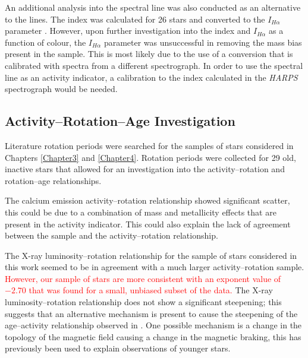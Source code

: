 An additional analysis into the \Halpha spectral line was also conducted as an alternative to the \caII lines. The \Halpha index was calculated for 26 stars and converted to the $I_{H\alpha}$ parameter \citep{Gomes_da_Silva_etal_2014}. However, upon further investigation into the \Halpha index and $I_{H\alpha}$ as a function of colour, the $I_{H\alpha}$ parameter was unsuccessful in removing the mass bias present in the sample. This is most likely due to the use of a conversion that is calibrated with spectra from a different spectrograph. In order to use the \Halpha spectral line as an activity indicator, a calibration to the \Halpha index calculated in the \textit{HARPS} spectrograph would be needed.

\subsection{Activity--Rotation--Age Investigation}

Literature rotation periods were searched for the samples of stars considered in Chapters \ref{Chapter3} and \ref{Chapter4}. Rotation periods were collected for 29 old, inactive stars that allowed for an investigation into the activity--rotation and rotation--age relationships.

The calcium emission activity--rotation relationship showed significant scatter, this could be due to a combination of mass and metallicity effects that are present in the \Rprime activity indicator. This could also explain the lack of agreement between the sample and the \citet{Mamajek_Hillenbrand_2008} activity--rotation relationship.

The X-ray luminosity--rotation relationship for the sample of stars considered in this work seemed to be in agreement with a much larger activity--rotation sample. \textcolor{red}{However, our sample of stars are more consistent with an exponent value of $−2.70$ that was found for a small, unbiased subset of the \citet{Wright_etal_2011} data.} The X-ray luminosity--rotation relationship does not show a significant steepening; this suggests that an alternative mechanism is present to cause the steepening of the age--activity relationship observed in \citet{Booth_etal_2017}. One possible mechanism is a change in the topology of the magnetic field causing a change in the magnetic braking, this has previously been used to explain observations of younger stars.

